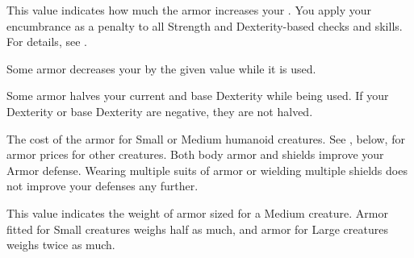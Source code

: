          This value indicates how much the armor increases your .
        You apply your encumbrance as a penalty to all Strength and Dexterity-based checks and skills.
        For details, see .

         Some armor decreases your  by the given value while it is used.

         Some armor halves your current and base Dexterity while being used.
        If your Dexterity or base Dexterity are negative, they are not halved.

         The cost of the armor for Small or Medium humanoid creatures.
        See , below, for armor prices for other creatures.
         Both body armor and shields improve your Armor defense.
        Wearing multiple suits of armor or wielding multiple shields does not improve your defenses any further.

         This value indicates the weight of armor sized for a Medium creature.
        Armor fitted for Small creatures weighs half as much, and armor for Large creatures weighs twice as much.

